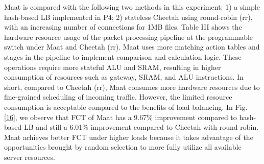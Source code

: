 Maat is compared with the following two methods in this experiment: 1) a simple hash-based LB implemented in P4; 2) stateless Cheetah using round-robin (rr), with an increasing number of connections for 1MB files. Table III shows the hardware resource usage of the packet processing pipeline at the programmable switch under Maat and Cheetah (rr). Maat uses more matching action tables and stages in the pipeline to implement comparison and calculation logic. These operations require more stateful ALU and SRAM, resulting in higher consumption of resources such as gateway, SRAM, and ALU instructions. In short, compared to Cheetah (rr), Maat consumes more hardware resources due to fine-grained scheduling of incoming traffic. However, the limited resource consumption is acceptable compared to the benefits of load balancing. In Fig. \ref{16}, we observe that FCT of Maat has a 9.67\% improvement compared to hash-based LB and still a 6.01\% improvement compared to Cheetah with round-robin. Maat achieves better FCT under higher loads because it takes advantage of the opportunities brought by random selection to more fully utilize all available server resources.